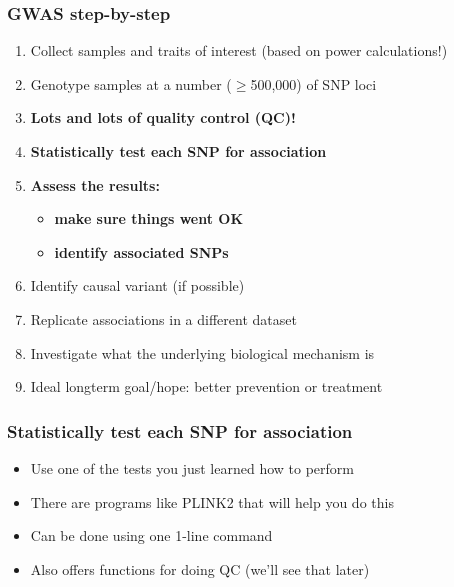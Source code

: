 \documentclass[xcolor=pdftex,dvipsnames,table,10pt]{beamer}
\begin{document}
\begin{frame}
\vspace{-.5cm}
  \frametitle{GWAS step-by-step}
 \small 
  \begin{enumerate}
 \item Collect samples and traits of interest (based on power calculations!) %
  \item Genotype samples at a number ($\geq$500,000) of SNP loci 
  \item \textbf{Lots and lots of quality control (QC)!}
  \item \textbf{Statistically test each SNP for association}
\item \textbf{Assess the results:} 
\begin{itemize}
\item \textbf{make sure things went OK} 
\item \textbf{identify associated SNPs}
    \end{itemize}  
\item	Identify causal variant (if possible)
\item	Replicate associations in a different dataset
\item Investigate what the underlying biological mechanism is
\item Ideal longterm goal/hope: better prevention or treatment
  \end{enumerate}
\end{frame}

\begin{frame}
  \frametitle{Statistically test each SNP for association}
\small
\vspace{-2.8cm}
\begin{itemize}
\item Use one of the tests you just learned how to perform
\item There are programs like PLINK2 that will help you do this 
\item Can be done using one 1-line command 
\item Also offers functions for doing QC (we'll see that later)
\end{itemize}
\end{frame}
\end{document}
